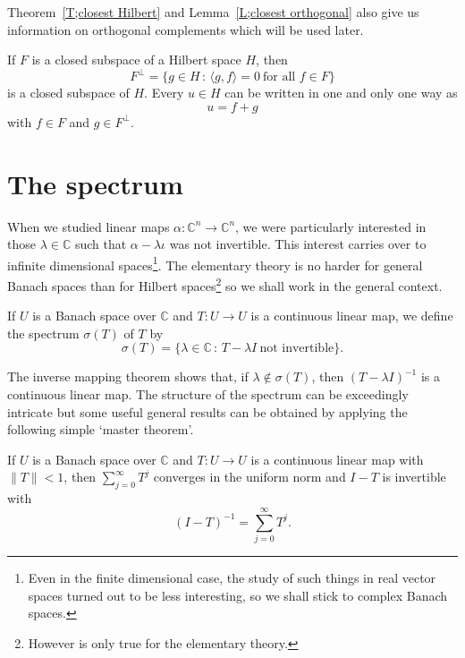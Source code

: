 Theorem~\ref{T;closest Hilbert} 
and Lemma~\ref{L;closest orthogonal}
also give us information on orthogonal complements
which will be used later.
\begin{lemma} If $F$ is a closed subspace of a Hilbert space $H$,
then 
\[F^{\perp}=
\{g\in H\,:\,\langle g,f\rangle=0\ \text{for all $f\in F$}\}\]
is a closed subspace of $H$. Every $u\in H$ can be written in one
and only one way as
\[u=f+g\]
with $f\in F$ and $g\in F^{\perp}$.
\end{lemma} 
\section{The spectrum} When we studied linear maps
$\alpha:{\mathbb C}^{n}\rightarrow{\mathbb C}^{n}$,
we were particularly interested in those $\lambda\in{\mathbb C}$
such that $\alpha-\lambda\iota$ was not invertible. This interest
carries over to infinite dimensional spaces\footnote{Even in the finite
dimensional case, the study of such things in real vector spaces
turned out to be less interesting, so we shall stick to
complex Banach spaces.}. The elementary theory is no harder
for general Banach spaces than for Hilbert 
spaces\footnote{However
is only true for the elementary theory.} so we shall
work in the general context.

\begin{definition} If $U$ is a Banach space over ${\mathbb C}$
and $T:U\rightarrow U$ is a continuous linear map, we define
the spectrum $\sigma(T)$ of $T$ by
\[\sigma(T)=\{\lambda\in{\mathbb C}\,:\,T-\lambda I
\ \text{not invertible}\}.\]
\end{definition}
The inverse mapping theorem shows that, if $\lambda\notin \sigma(T)$,
then $(T-\lambda I)^{-1}$ is a continuous linear map.
The structure of the spectrum can be exceedingly intricate
but some useful general results can be obtained by applying
the following simple `master theorem'.
\begin{theorem} If $U$ is a Banach space over ${\mathbb C}$
and $T:U\rightarrow U$ is a continuous linear map
with $\|T\|<1$, then $\sum_{j=0}^{\infty}T^{j}$ converges
in the uniform norm and $I-T$ is invertible with
\[(I-T)^{-1}=\sum_{j=0}^{\infty}T^{j}.\]
\end{theorem}
 
